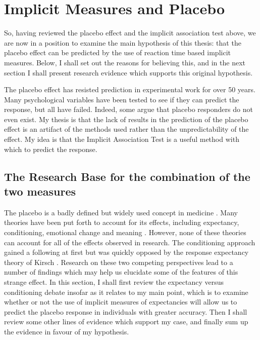 \section{Implicit Measures and Placebo}

So, having reviewed the placebo effect and the implicit association test above, we are now in a position to examine the main hypothesis of this thesis: that the placebo effect can be predicted by the use of reaction time based implicit measures. Below, I shall set out the reasons for believing this, and in the next section I shall present research evidence which supports this original hypothesis. 

The placebo effect has resisted prediction in experimental work for over 50 years. Many psychological variables have been tested to see if they can predict the response, but all have failed\cite{Shapiro1997}. Indeed, some argue that placebo responders do not even exist\cite{Kaptchuk2008a}. My thesis is that the lack of results in the prediction of the placebo effect is an artifact of the methods used rather than the unpredictability of the effect. My idea is that the Implicit Association Test is a useful method with which to predict the response. 


\subsection{The Research Base for the combination of the two measures}

The placebo is a badly defined but widely used concept in medicine \cite{Kaptchuk1998} . Many theories have been put forth to account for its effects, including expectancy, conditioning, emotional change and meaning \cite{Stewart-Williams2004b}. However, none of these theories can account for all of the effects observed in research. The conditioning approach gained a following at first \cite{Voudouris1985}  but was quickly opposed by the response expectancy theory of Kirsch \cite{Kirsch1985,Kirsch1997}. Research on these two competing perspectives lead to a number of findings which may help us elucidate some of the features of this strange effect. In this section, I shall first review the expectancy versus conditioning debate insofar as it relates to my main point, which is to examine whether or not the use of implicit measures of expectancies will allow us to predict the placebo response in individuals with greater accuracy. Then I shall review some other lines of evidence which support my case, and finally sum up the evidence in favour of my hypothesis.

